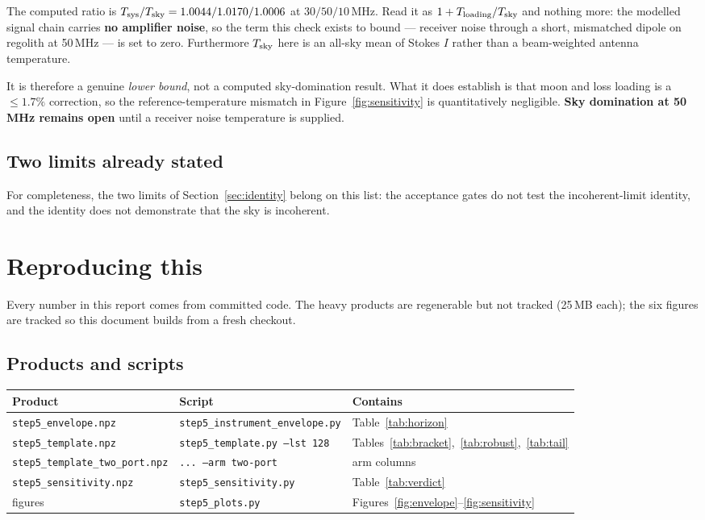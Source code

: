 \documentclass[11pt]{article}
\newcommand{\code}[1]{\texttt{#1}}
\begin{document}
The computed ratio is
$T_{\rm sys}/T_{\rm sky} = 1.0044 / 1.0170 / 1.0006$ at
$30/50/10$\,MHz. Read it as $1 + T_{\rm loading}/T_{\rm sky}$ and
nothing more: the modelled signal chain carries \textbf{no amplifier
noise}, so the term this check exists to bound --- receiver noise through
a short, mismatched dipole on regolith at 50\,MHz --- is set to zero.
Furthermore $T_{\rm sky}$ here is an all-sky mean of Stokes $I$ rather
than a beam-weighted antenna temperature.

It is therefore a genuine \emph{lower bound}, not a computed
sky-domination result. What it does establish is that moon and loss
loading is a $\le1.7\%$ correction, so the reference-temperature mismatch
in Figure~\ref{fig:sensitivity} is quantitatively negligible.
\textbf{Sky domination at 50\,MHz remains open} until a receiver noise
temperature is supplied.

\subsection{Two limits already stated}

For completeness, the two limits of Section~\ref{sec:identity} belong on
this list: the acceptance gates do not test the incoherent-limit
identity, and the identity does not demonstrate that the sky is
incoherent.

\section{Reproducing this}
\label{sec:repro}

Every number in this report comes from committed code. The heavy
products are regenerable but not tracked (25\,MB each); the six figures
are tracked so this document builds from a fresh checkout.

\subsection{Products and scripts}

\begin{center}
\begin{tabular}{lll}
\toprule
Product & Script & Contains \\
\midrule
\code{step5\_envelope.npz} & \code{step5\_instrument\_envelope.py}
  & Table~\ref{tab:horizon} \\
\code{step5\_template.npz} & \code{step5\_template.py --lst 128}
  & Tables~\ref{tab:bracket},~\ref{tab:robust},~\ref{tab:tail} \\
\code{step5\_template\_two\_port.npz} & \code{... --arm two-port}
  & arm columns \\
\code{step5\_sensitivity.npz} & \code{step5\_sensitivity.py}
  & Table~\ref{tab:verdict} \\
figures & \code{step5\_plots.py}
  & Figures~\ref{fig:envelope}--\ref{fig:sensitivity} \\
\bottomrule
\end{tabular}
\end{center}
\end{document}
